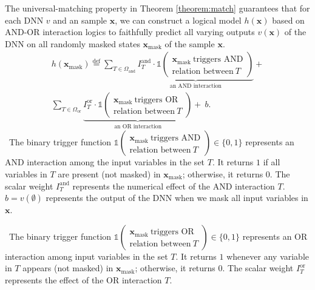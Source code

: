 \documentclass[10pt,twocolumn,letterpaper]{article}
\begin{document}
The universal-matching property in Theorem \ref{theorem:match}
guarantees that for each DNN $v$ and an sample $\mathbf{x}$,
we can construct a logical model $h(\mathbf{x})$ based on AND-OR interaction logics to faithfully predict all varying outputs $v(\mathbf{x})$ of the DNN on all randomly masked states $\mathbf{x}_\text{mask}$ of the sample $\mathbf{x}$.
{
\small
\begin{equation}\label{ref::universal-match}
    \begin{split}
        h(\mathbf{x}_\text{mask}) \overset{\text{def}}{=}
    \sum_{T \in \Omega_{\text{and}}}
    \underbrace{I^{\text{and}}_T \cdot \mathbb{1}(\substack{\mathbf{x}_\text{mask}\  {\scriptstyle\text{triggers AND}} \\{\scriptstyle\text{relation between}} \ T})}_{\text{an AND interaction}} +\\
    \sum_{T \in \Omega_{\text{or}}}
    \underbrace{I^{\text{or}}_T \cdot \mathbb{1}(\substack{\mathbf{x}_\text{mask}\  {\scriptstyle\text{triggers OR}} \\ {\scriptstyle\text{relation between}} \ T})}_{\text{an OR interaction}} + \ b.
    \end{split}
\end{equation}
}
\textbullet \ The binary trigger function \( \mathbb{1} \left( \substack{\mathbf{x}_\text{mask} \ {\scriptstyle \text{triggers AND}} \\ {\scriptstyle \text{relation between}} \ T} \right) \in \{0, 1\} \) represents an AND interaction among the input variables in the set \( T \). It returns \( 1 \) if all variables in \( T \) are present (not masked) in \( \mathbf{x}_\text{mask} \); otherwise, it returns \( 0 \). The scalar weight $I^{\text{and}}_T$ represents the numerical effect of the AND interaction $T$. $b=v(\emptyset)$ represents the output of the DNN when we mask all input variables in $\mathbf{x}$.

\textbullet \ The binary trigger function \( \mathbb{1} \left( \substack{\mathbf{x}_{\text{mask}} \ {\scriptstyle \text{triggers OR}} \\ {\scriptstyle \text{relation between}} \ T} \right) \in \{0, 1\} \) represents an OR interaction among input variables in the set \( T \). It returns \( 1 \) whenever any variable in \( T \) appears (not masked) in \( \mathbf{x}_\text{mask} \); otherwise, it returns \( 0 \). The scalar weight $I^{\text{or}}_T$ represents the effect of the OR interaction $T$.
\end{document}
